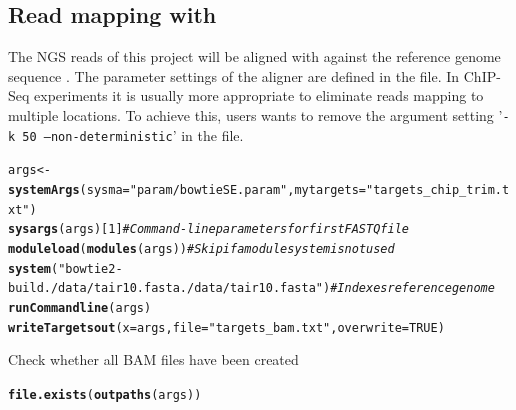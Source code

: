 \documentclass{article}\usepackage[]{graphicx}\usepackage[]{color}
\makeatletter
\newcommand{\hlnum}[1]{\textcolor[rgb]{0.686,0.059,0.569}{#1}}%
\newcommand{\hlstr}[1]{\textcolor[rgb]{0.192,0.494,0.8}{#1}}%
\newcommand{\hlcom}[1]{\textcolor[rgb]{0.678,0.584,0.686}{\textit{#1}}}%
\newcommand{\hlstd}[1]{\textcolor[rgb]{0.345,0.345,0.345}{#1}}%
\newcommand{\hlkwb}[1]{\textcolor[rgb]{0.69,0.353,0.396}{#1}}%
\newcommand{\hlkwc}[1]{\textcolor[rgb]{0.333,0.667,0.333}{#1}}%
\newcommand{\hlkwd}[1]{\textcolor[rgb]{0.737,0.353,0.396}{\textbf{#1}}}%
\newenvironment{kframe}{%
 \def\at@end@of@kframe{}%
 \ifinner\ifhmode%
  \def\at@end@of@kframe{\end{minipage}}%
  \begin{minipage}{\columnwidth}%
 \fi\fi%
 \def\FrameCommand##1{\hskip\@totalleftmargin \hskip-\fboxsep
 \colorbox{shadecolor}{##1}\hskip-\fboxsep
     \hskip-\linewidth \hskip-\@totalleftmargin \hskip\columnwidth}%
 \MakeFramed {\advance\hsize-\width
   \@totalleftmargin\z@ \linewidth\hsize
   \@setminipage}}%
 {\par\unskip\endMakeFramed%
 \at@end@of@kframe}
\newenvironment{knitrout}{}{} %
\newcommand{\Rfunarg}[1]{{\texttt{#1}}}
\makeatother
\begin{document}
\subsection{Read mapping with }
The NGS reads of this project will be aligned with  against the reference genome sequence \citep{Langmead2012-bs}. The parameter settings of the aligner are defined in the  file. In ChIP-Seq experiments it is usually more appropriate to eliminate reads mapping to multiple locations. To achieve this, users wants to remove the argument setting '\Rfunarg{-k 50 --non-deterministic}' in the  file.
\begin{knitrout}
\color{fgcolor}\begin{kframe}
\begin{alltt}
\hlstd{args} \hlkwb{<-} \hlkwd{systemArgs}\hlstd{(}\hlkwc{sysma}\hlstd{=}\hlstr{"param/bowtieSE.param"}\hlstd{,} \hlkwc{mytargets}\hlstd{=}\hlstr{"targets_chip_trim.txt"}\hlstd{)}
\hlkwd{sysargs}\hlstd{(args)[}\hlnum{1}\hlstd{]} \hlcom{# Command-line parameters for first FASTQ file}
\hlkwd{moduleload}\hlstd{(}\hlkwd{modules}\hlstd{(args))} \hlcom{# Skip if a module system is not used}
\hlkwd{system}\hlstd{(}\hlstr{"bowtie2-build ./data/tair10.fasta ./data/tair10.fasta"}\hlstd{)} \hlcom{# Indexes reference genome}
\hlkwd{runCommandline}\hlstd{(args)}
\hlkwd{writeTargetsout}\hlstd{(}\hlkwc{x}\hlstd{=args,} \hlkwc{file}\hlstd{=}\hlstr{"targets_bam.txt"}\hlstd{,} \hlkwc{overwrite}\hlstd{=}\hlnum{TRUE}\hlstd{)}
\end{alltt}
\end{kframe}
\end{knitrout}
Check whether all BAM files have been created
\begin{knitrout}
\color{fgcolor}\begin{kframe}
\begin{alltt}
\hlkwd{file.exists}\hlstd{(}\hlkwd{outpaths}\hlstd{(args))}
\end{alltt}
\end{kframe}
\end{knitrout}
\end{document}
